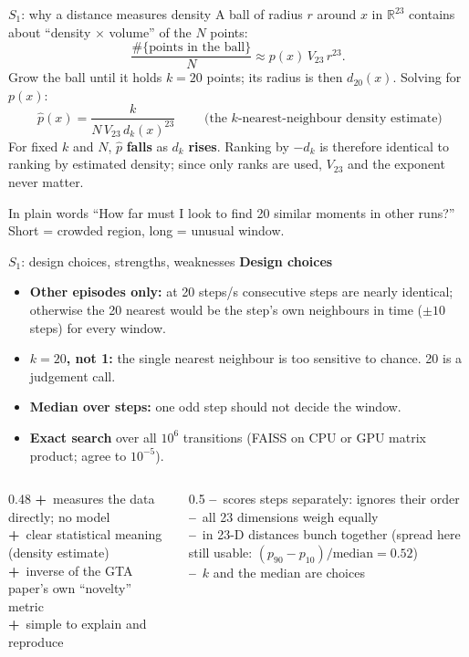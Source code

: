 \documentclass[aspectratio=169,11pt]{beamer}
\newcommand{\R}{\mathbb{R}}
\newcommand{\pro}{\textcolor{green!45!black}{\textbf{+}}\ }
\newcommand{\con}{\textcolor{red!60!black}{\textbf{--}}\ }
\begin{document}
\begin{frame}{$S_1$: why a distance measures density}
A ball of radius $r$ around $x$ in $\R^{23}$ contains about ``density $\times$ volume'' of the $N$ points:
\[
\frac{\#\{\text{points in the ball}\}}{N}\approx p(x)\,V_{23}\,r^{23}.
\]
Grow the ball until it holds $k=20$ points; its radius is then $d_{20}(x)$. Solving for $p(x)$:
\[
\boxed{\;\hat p(x)=\frac{k}{N\,V_{23}\,d_k(x)^{23}}\;}
\qquad\text{(the $k$-nearest-neighbour density estimate)}
\]
For fixed $k$ and $N$, $\hat p$ \textbf{falls} as $d_k$ \textbf{rises}. Ranking by $-d_k$ is therefore identical to ranking by estimated density; since only ranks are used, $V_{23}$ and the exponent never matter.
\vspace{0.5em}
\begin{block}{In plain words}
``How far must I look to find 20 similar moments in other runs?'' Short = crowded region, long = unusual window.
\end{block}
\end{frame}

\begin{frame}{$S_1$: design choices, strengths, weaknesses}
\small
\textbf{Design choices}
\begin{itemize}
\item \textbf{Other episodes only:} at 20 steps/s consecutive steps are nearly identical; otherwise the 20 nearest would be the step's own neighbours in time ($\pm10$ steps) for every window.
\item \textbf{$k=20$, not 1:} the single nearest neighbour is too sensitive to chance. 20 is a judgement call.
\item \textbf{Median over steps:} one odd step should not decide the window.
\item \textbf{Exact search} over all $10^6$ transitions (FAISS on CPU or GPU matrix product; agree to $10^{-5}$).
\end{itemize}
\begin{columns}[T]
\begin{column}{0.48\linewidth}
\pro measures the data directly; no model\\
\pro clear statistical meaning (density estimate)\\
\pro inverse of the GTA paper's own ``novelty'' metric\\
\pro simple to explain and reproduce
\end{column}
\begin{column}{0.5\linewidth}
\con scores steps separately: ignores their order\\
\con all 23 dimensions weigh equally\\
\con in 23-D distances bunch together (spread here still usable: $(p_{90}-p_{10})/\text{median}=0.52$)\\
\con $k$ and the median are choices
\end{column}
\end{columns}
\end{frame}
\end{document}
